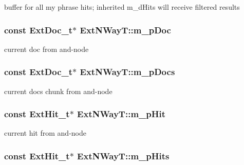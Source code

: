 buffer for all my phrase hits; inherited m\-\_\-d\-Hits will receive filtered results 

\hypertarget{classExtNWayT_a742a2d7095e8838c786d73f9a81244ea}{
\subsubsection[{m\-\_\-p\-Doc}]{\setlength{\rightskip}{0pt plus 5cm}const {\bf Ext\-Doc\-\_\-t}$\ast$ Ext\-N\-Way\-T\-::m\-\_\-p\-Doc\hspace{0.3cm}{\ttfamily [protected]}}}\label{classExtNWayT_a742a2d7095e8838c786d73f9a81244ea}


current doc from and-\/node 

\hypertarget{classExtNWayT_a6c89c11051d51dacaa87cde3df1e075e}{
\subsubsection[{m\-\_\-p\-Docs}]{\setlength{\rightskip}{0pt plus 5cm}const {\bf Ext\-Doc\-\_\-t}$\ast$ Ext\-N\-Way\-T\-::m\-\_\-p\-Docs\hspace{0.3cm}{\ttfamily [protected]}}}\label{classExtNWayT_a6c89c11051d51dacaa87cde3df1e075e}


current docs chunk from and-\/node 

\hypertarget{classExtNWayT_a3830765f51cc9f63d55546a69409b293}{
\subsubsection[{m\-\_\-p\-Hit}]{\setlength{\rightskip}{0pt plus 5cm}const {\bf Ext\-Hit\-\_\-t}$\ast$ Ext\-N\-Way\-T\-::m\-\_\-p\-Hit\hspace{0.3cm}{\ttfamily [protected]}}}\label{classExtNWayT_a3830765f51cc9f63d55546a69409b293}


current hit from and-\/node 

\hypertarget{classExtNWayT_a32939fecb6b143a06827474beb012f0c}{
\subsubsection[{m\-\_\-p\-Hits}]{\setlength{\rightskip}{0pt plus 5cm}const {\bf Ext\-Hit\-\_\-t}$\ast$ Ext\-N\-Way\-T\-::m\-\_\-p\-Hits\hspace{0.3cm}{\ttfamily [protected]}}}\label{classExtNWayT_a32939fecb6b143a06827474beb012f0c}


